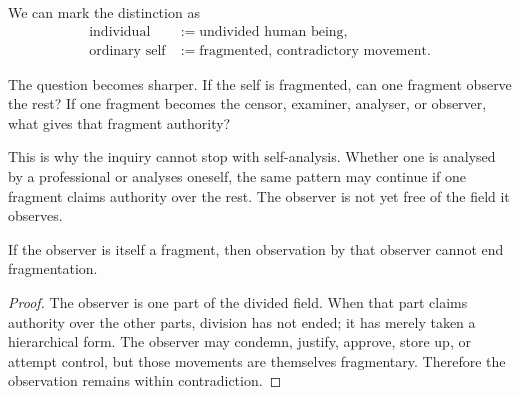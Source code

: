 We can mark the distinction as
\begin{align}
\text{individual} &:= \text{undivided human being},\\
\text{ordinary self} &:= \text{fragmented, contradictory movement}.
\end{align}

The question becomes sharper. If the self is fragmented, can one fragment observe the rest? If one fragment becomes the censor, examiner, analyser, or observer, what gives that fragment authority?

\begin{figure}
\centering
{}
\end{figure}

This is why the inquiry cannot stop with self-analysis. Whether one is analysed by a professional or analyses oneself, the same pattern may continue if one fragment claims authority over the rest. The observer is not yet free of the field it observes.

\begin{proposition}
If the observer is itself a fragment, then observation by that observer cannot end fragmentation.
\end{proposition}

\begin{proof}
The observer is one part of the divided field. When that part claims authority over the other parts, division has not ended; it has merely taken a hierarchical form. The observer may condemn, justify, approve, store up, or attempt control, but those movements are themselves fragmentary. Therefore the observation remains within contradiction.
\end{proof}

